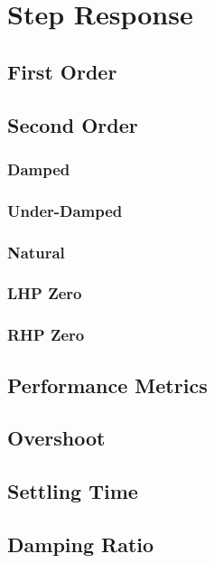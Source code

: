 \section*{Step Response}
\subsection*{First Order}
\subsection*{Second Order}
\subsubsection*{Damped}
\subsubsection*{Under-Damped}
\subsubsection*{Natural}
\subsubsection*{LHP Zero}
\subsubsection*{RHP Zero}
\subsection*{Performance Metrics}
\subsection*{Overshoot}
\subsection*{Settling Time}
\subsection*{Damping Ratio}
